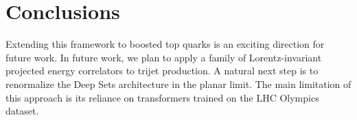 \section{Conclusions}\label{sec:conclusions}

Extending this framework to boosted top quarks is an exciting direction
for future work. In future work, we plan to apply a family of
Lorentz-invariant projected energy correlators to trijet production. A
natural next step is to renormalize the Deep Sets architecture in the
planar limit. The main limitation of this approach is its reliance on
transformers trained on the LHC Olympics dataset.

